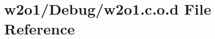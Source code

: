 \hypertarget{w2o1_8c_8o_8d}{}\section{w2o1/\+Debug/w2o1.c.\+o.\+d File Reference}
\label{w2o1_8c_8o_8d}
